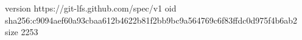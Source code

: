 version https://git-lfs.github.com/spec/v1
oid sha256:c9094aef60a93cbaa612b4622b81f2bb9bc9a564769c6f83ffdc0d975f4b6ab2
size 2253
